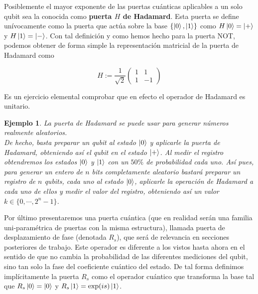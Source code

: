 \documentclass[11pt, spanish]{report}
\numberwithin{equation}{section}
\newtheorem{ejs}[defin]{Ejemplo}
\numberwithin{defin}{section}
\begin{document}
Posiblemente el mayor exponente de las puertas cuánticas aplicables a un solo qubit sea la conocida como \textbf{puerta $H$ de Hadamard}. Esta puerta se define unívocamente como la puerta que actúa sobre la base $\{\ket{0},\ket{1}\}$ como $H\ket{0}=\ket{+}$ y $H\ket{1}=\ket{-}$. Con tal definición y como hemos hecho para la puerta NOT, podemos obtener de forma simple la representación matricial de la puerta de Hadamard como

\begin{equation}
H:=\frac{1}{\sqrt{2}}\begin{pmatrix}
1 & 1 \\
1 & -1
\end{pmatrix}
\end{equation} 

Es un ejercicio elemental comprobar que en efecto el operador de Hadamard es unitario\footnotemark{}.


\begin{ejs}\label{aleatorio} La puerta de Hadamard se puede usar para generar números realmente aleatorios.\\

De hecho, basta preparar un qubit al estado $\ket{0}$ y aplicarle la puerta de Hadamard, obteniendo así el qubit en el estado $\ket{+}$. Al medir el registro obtendremos los estados $\ket{0}$ y $\ket{1}$ con un $50\%$ de probabilidad cada uno. Así pues, para generar un entero de $n$ bits completamente aleatorio bastará preparar un registro de $n$ qubits, cada uno al estado $\ket{0}$, aplicarle la operación de Hadamard a cada uno de ellos y medir el valor del registro, obteniendo así un valor $k\in\{0,\cdots,2^n-1\}$.
\end{ejs}

Por último presentaremos una puerta cuántica (que en realidad serán una familia uni-paramétrica de puertas con la misma estructura), llamada puerta de desplazamiento de fase (denotada $R_s$), que será de relevancia en secciones posteriores de trabajo. Este operador es diferente a los vistos hasta ahora en el sentido de que no cambia la probabilidad de las diferentes mediciones del qubit, sino tan solo la fase del coeficiente cuántico del estado. De tal forma definimos implícitamente la puerta $R_s$ como el operador cuántico que transforma la base tal que $R_s\ket{0}=\ket{0}$ y $R_s\ket{1}=\exp(is)\ket{1}$.
\end{document}
